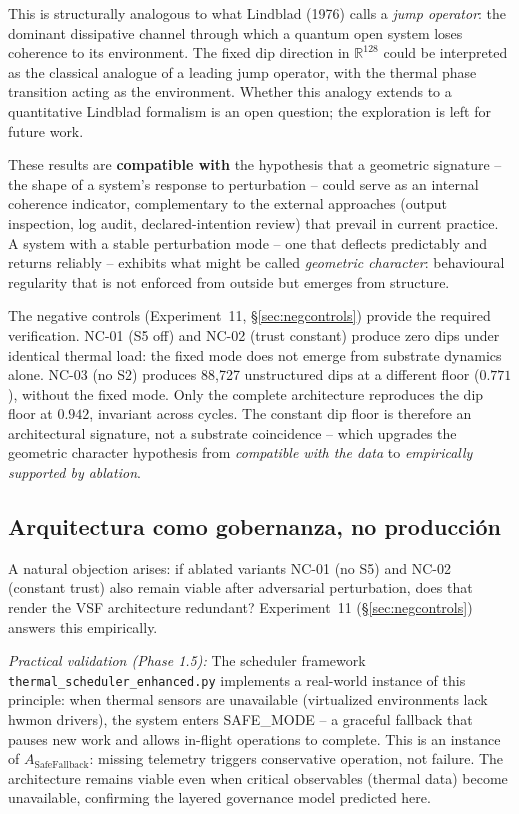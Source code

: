 \documentclass[11pt, a4paper]{article}
\begin{document}
This is structurally analogous to what Lindblad (1976) calls a \emph{jump
operator}: the dominant dissipative channel through which a quantum open system
loses coherence to its environment.  The fixed dip direction in $\mathbb{R}^{128}$ could
be interpreted as the classical analogue of a leading jump operator, with the
thermal phase transition acting as the environment.
Whether this analogy extends to a quantitative Lindblad formalism is an open
question; the exploration is left for future work.

These results are \textbf{compatible with} the hypothesis that a geometric
signature -- the shape of a system's response to perturbation -- could serve
as an internal coherence indicator, complementary to the external approaches
(output inspection, log audit, declared-intention review) that prevail in
current practice.
A system with a stable perturbation mode -- one that deflects predictably and
returns reliably -- exhibits what might be called \emph{geometric character}:
behavioural regularity that is not enforced from outside but emerges from
structure.

The negative controls (Experiment~11, \S\ref{sec:negcontrols}) provide the
required verification.
NC-01 (S5 off) and NC-02 (trust constant) produce zero dips under identical
thermal load: the fixed mode does not emerge from substrate dynamics alone.
NC-03 (no S2) produces 88,727 unstructured dips at a different floor ($0.771$),
without the fixed mode.
Only the complete architecture reproduces the dip floor at $0.942$, invariant
across cycles.
The constant dip floor is therefore an architectural signature, not a substrate
coincidence -- which upgrades the geometric character hypothesis from
\emph{compatible with the data} to \emph{empirically supported by ablation}.

\subsection{Arquitectura como gobernanza, no producción}
\label{sec:governance}

A natural objection arises: if ablated variants NC-01 (no S5) and NC-02
(constant trust) also remain viable after adversarial perturbation, does that
render the VSF architecture redundant?
Experiment~11 (\S\ref{sec:negcontrols}) answers this empirically.

\textit{Practical validation (Phase 1.5):}
The scheduler framework \texttt{thermal\_scheduler\_enhanced.py} implements
a real-world instance of this principle: when thermal sensors are unavailable
(virtualized environments lack hwmon drivers), the system enters SAFE\_MODE --
a graceful fallback that pauses new work and allows in-flight operations to
complete. This is an instance of $A_\text{SafeFallback}$: missing telemetry
triggers conservative operation, not failure. The architecture remains viable
even when critical observables (thermal data) become unavailable, confirming
the layered governance model predicted here.
\end{document}
